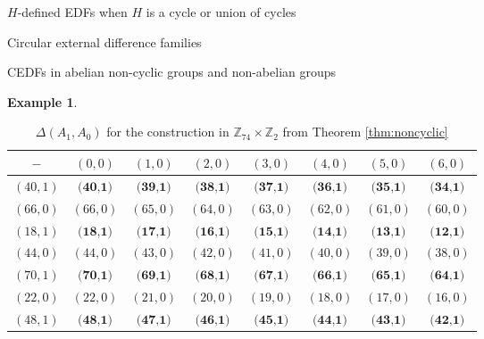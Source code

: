 \documentclass[12pt, a4paper]{article}
\theoremstyle{definition}
\newtheorem{example}[theorem]{Example}
\begin{document}
\begin{section}{$H$-defined EDFs when $H$ is a cycle or union of cycles}
\begin{subsection}{Circular external difference families}
\begin{subsection}{CEDFs in abelian non-cyclic groups and non-abelian groups}
\begin{example}
\begin{table}[h]
\renewcommand{\arraystretch}{1.2}
\centering
\setlength\tabcolsep{3pt}
\begin{tabular}{|c|ccccccc|} 
\hline
$-$ & $(0,0)$ & $(1,0)$ & $(2,0)$ & $(3,0)$ & $(4,0)$ & $(5,0)$ & $(6,0)$ \\ \hline
$(40,1)$ & $\textbf{(40,1)}$ & $\textbf{(39,1)}$ &	$\textbf{(38,1)}$ & $\textbf{(37,1)}$ &	$\textbf{(36,1)}$	& $\textbf{(35,1)}$ & $\textbf{(34,1)}$ \\
$(66,0)$ & $ (66,0)$	& $(65,0)$ & $(64,0)$ & $(63,0)$	& $(62,0)$	& $(61,0)$	& $(60,0)$ \\
$(18,1)$ & $ \textbf{(18,1)}$ & $	\textbf{(17,1)}$ & $	\textbf{(16,1)}	$ & $\textbf{(15,1)}	$ & $\textbf{(14,1)}$ & $	\textbf{(13,1)}$ &$	\textbf{(12,1)}$ \\
$(44,0)$ & $ (44,0)$ & $(43,0)$ & $(42,0)$ & $(41,0)	$ & $(40,0)	$ & $(39,0)	$ & $(38,0)$ \\
$(70,1)$ & $ \textbf{(70,1)}$ & $	\textbf{(69,1)}	$ & $\textbf{(68,1)}$ & $	\textbf{(67,1)}	$ & $\textbf{(66,1)}	$ & $\textbf{(65,1)}$ & $	\textbf{(64,1)}$ \\
$(22,0)$ & $ (22,0)$ & $	(21,0)$ & $(20,0)$  & $	(19,0)$ & $(18,0)$ & $(17,0)$ & $(16,0)$ \\
$(48,1)$ & $ \textbf{(48,1)}$ & $	\textbf{(47,1)}$ & $	\textbf{(46,1)}	$ & $\textbf{(45,1)}	$ & $\textbf{(44,1)}$ & $	\textbf{(43,1)}	$ & $\textbf{(42,1)}$ \\
\hline
\end{tabular}
	
\caption{$\Delta(A_1,A_0)$ for the construction in $\mathbb{Z}_{74} \times \mathbb{Z}_2$ from Theorem \ref{thm:noncyclic}}
\label{table:A_1A_0}
\end{table}



\end{example}
\end{subsection}
\end{subsection}
\end{section}
\end{document}
